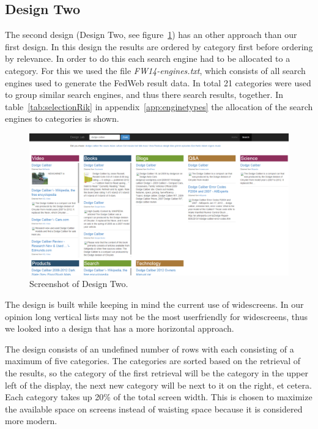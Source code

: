 \documentclass[12pt]{article}
\begin{document}
\subsection{Design Two}
\label{sec:layoutRik}
The second design (Design Two, see figure~\ref{fig:designTwo}) has an other approach than our first design.
In this design the results are ordered by category first before ordering by relevance.
In order to do this each search engine had to be allocated to a category.
For this we used the file \textit{FW14-engines.txt}, which consists of all search engines used to generate the FedWeb result data.
In total 21 categories were used to group similar search engines, and thus there search results, together.
In table~\ref{tab:selectionRik} in appendix~\ref{app:enginetypes} the allocation of the search engines to categories is shown.

\begin{figure}[h!]
  \centering
    \includegraphics[width=1.0\textwidth]{designTwo.png}
  \caption{Screenshot of Design Two.}
\label{fig:designTwo}
\end{figure}

The design is built while keeping in mind the current use of widescreens.
In our opinion long vertical lists may not be the most userfriendly for widescreens, thus we looked into a design that has a more horizontal approach.

The design consists of an undefined number of rows with each consisting of a maximum of five categories.
The categories are sorted based on the retrieval of the results, so the category of the first retrieval will be the category in the upper left of the display, the next new category will be next to it on the right, et cetera.
Each category takes up 20\% of the total screen width.
This is chosen to maximize the available space on screens instead of waisting space because it is considered more modern.
\end{document}
